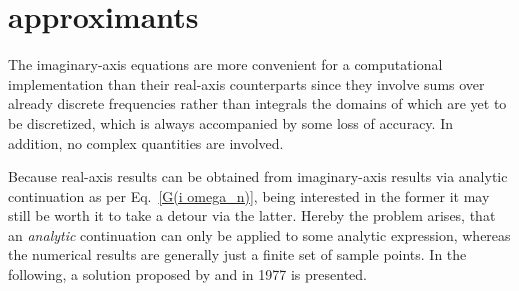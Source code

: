 \section{ approximants}
\label{Pade approximants}

The imaginary-axis  equations are more convenient for a
computational implementation than their real-axis counterparts since they
involve sums over already discrete  frequencies rather than
integrals the domains of which are yet to be discretized, which is always
accompanied by some loss of accuracy. In addition, no complex quantities are
involved.

Because real-axis results can be obtained from imaginary-axis results via
analytic continuation as per Eq.~\ref{G(i omega_n)}, being interested in the
former it may still be worth it to take a detour via the latter. Hereby the
problem arises, that an \emph{analytic} continuation can only be applied to some
analytic expression, whereas the numerical results are generally just a finite
set of sample points. In the following, a solution proposed by 
and  in 1977 \cite{VidbergSerene77} is presented.

